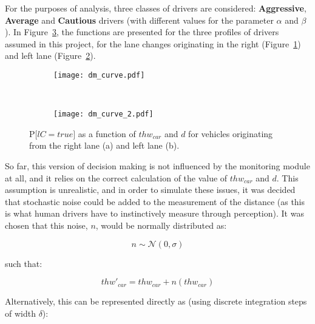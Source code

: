 For the purposes of analysis, three classes of drivers are considered: \textbf{Aggressive}, \textbf{Average} and \textbf{Cautious} drivers (with different values for the parameter $\alpha$ and $\beta$). In Figure~\ref{fig:dm_curves}, the functions are presented for the three profiles of drivers assumed in this project, for the lane changes originating in the right (Figure~\ref{fig:dm_curve_right}) and left lane (Figure~\ref{fig:dm_curve_left}).

\begin{figure}
\centering
\begin{subfigure}{1\textwidth}
	\centering
	\texttt{[image: dm\_curve.pdf]}
	\label{fig:dm_curve_right}
\end{subfigure}\\
\begin{subfigure}{1\textwidth}
	\centering
	\texttt{[image: dm\_curve\_2.pdf]}
	\label{fig:dm_curve_left}
\end{subfigure}\vspace{1em}
\caption{$\text{P[}lC = true\text{]}$ as a function of $thw_{car}$ and $d$ for vehicles originating from the right lane (a) and left lane (b).}
\label{fig:dm_curves}
\end{figure}

So far, this version of decision making is not influenced by the monitoring module at all, and it relies on the correct calculation of the value of $thw_{car}$ and $d$. This assumption is unrealistic, and in order to simulate these issues, it was decided that stochastic noise could be added to the measurement of the distance (as this is what human drivers have to instinctively measure through perception). It was chosen that this noise, $n$, would be normally distributed as:

\begin{equation}
	n \sim \mathcal{N}(0, \sigma)
\end{equation}

such that:

\begin{equation}
	thw'_{car} = thw_{car} + n(thw_{car})
\end{equation}

Alternatively, this can be represented directly as (using discrete integration steps of width $\delta$):

